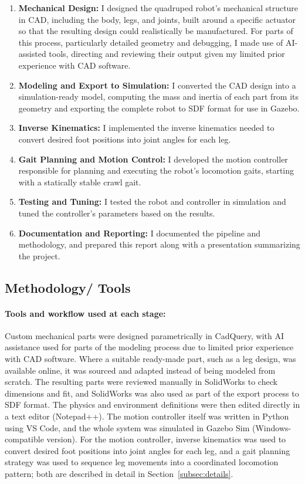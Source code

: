 \documentclass[12pt]{article}
\begin{document}
\begin{enumerate}
    \item \textbf{Mechanical Design:} I designed the quadruped robot's mechanical structure in CAD, including the body, legs, and joints, built around a specific actuator so that the resulting design could realistically be manufactured. For parts of this process, particularly detailed geometry and debugging, I made use of AI-assisted tools, directing and reviewing their output given my limited prior experience with CAD software.
    \item \textbf{Modeling and Export to Simulation:} I converted the CAD design into a simulation-ready model, computing the mass and inertia of each part from its geometry and exporting the complete robot to SDF format for use in Gazebo.
    \item \textbf{Inverse Kinematics:} I implemented the inverse kinematics needed to convert desired foot positions into joint angles for each leg.
    \item \textbf{Gait Planning and Motion Control:} I developed the motion controller responsible for planning and executing the robot's locomotion gaits, starting with a statically stable crawl gait.
    \item \textbf{Testing and Tuning:} I tested the robot and controller in simulation and tuned the controller's parameters based on the results.
    \item \textbf{Documentation and Reporting:} I documented the pipeline and methodology, and prepared this report along with a presentation summarizing the project.
\end{enumerate}

\subsection{Methodology/ Tools}
\label{subsec:methodology}
\paragraph{Tools and workflow used at each stage:} Custom mechanical parts were designed parametrically in CadQuery, with AI assistance used for parts of the modeling process due to limited prior experience with CAD software. Where a suitable ready-made part, such as a leg design, was available online, it was sourced and adapted instead of being modeled from scratch. The resulting parts were reviewed manually in SolidWorks to check dimensions and fit, and SolidWorks was also used as part of the export process to SDF format. The physics and environment definitions were then edited directly in a text editor (Notepad++). The motion controller itself was written in Python using VS Code, and the whole system was simulated in Gazebo Sim (Windows-compatible version). For the motion controller, inverse kinematics was used to convert desired foot positions into joint angles for each leg, and a gait planning strategy was used to sequence leg movements into a coordinated locomotion pattern; both are described in detail in Section~\ref{subsec:details}.
\end{document}
